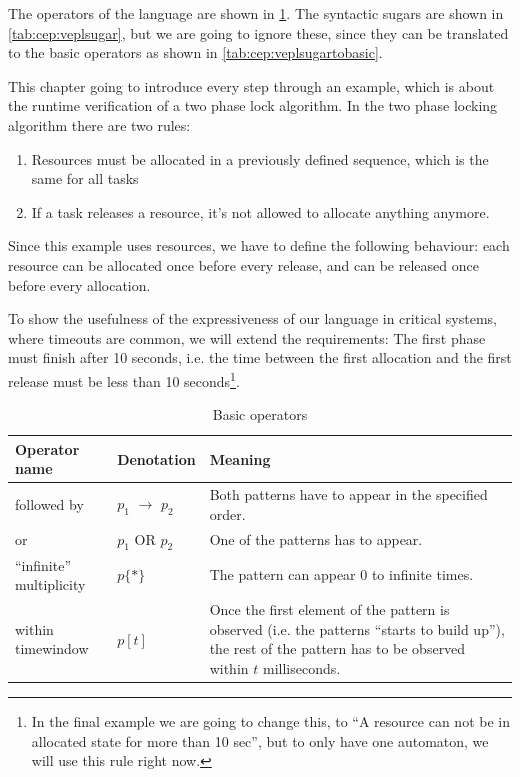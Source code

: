 		
		The operators of the language are shown in \cref{tab:cep:veplop}. 
		The syntactic sugars are shown in \cref{tab:cep:veplsugar},
		but we are going to ignore these, since they can be translated to the basic operators as shown in \cref{tab:cep:veplsugartobasic}.
		
		This chapter going to introduce every step through an example, which is about the runtime verification of a two phase lock algorithm. %
		In the two phase locking algorithm there are two rules:
		\begin{enumerate}
			\item Resources must be allocated in a previously defined sequence, which is the same for all tasks
			\item If a task releases a resource, it's not allowed to allocate anything anymore.
		\end{enumerate}
		
		Since this example uses resources, we have to define the following behaviour:
		each resource can be allocated once before every release, and can be released once before every allocation.
		
		To show the usefulness of the expressiveness of our language in critical systems, where timeouts are common, we will extend the requirements:
		The first phase must finish after 10 seconds,
		i.e. the time between the first allocation and the first release must be less than 10 seconds\footnote{In the final 
		example we are going to change this, to ``A resource can not be in allocated state for more than 10 sec'', but to 
		only have one automaton, we will use this rule right now.}.
		
			
		\begin{table}
		\caption{Basic operators}		
		\label{tab:cep:veplop}
			\begin{tabularx}{\textwidth}{llX}
				\toprule
				Operator name &	Denotation & Meaning \\
				\midrule
				followed by & $p_1$ $\rightarrow$ $p_2$ & Both patterns have to appear in the specified order. \\
				or & $p_1$ OR $p_2$ &	One of the patterns has to appear. \\
				``infinite'' multiplicity & $p\{\ast\}$ & The pattern can appear 0 to infinite times. \\
				within timewindow &	$p[t]$ & Once the first element of the pattern is observed (i.e. the patterns ``starts to build up''), the rest of the pattern has to be observed within $t$ milliseconds. \\
				\bottomrule
			\end{tabularx}
		\end{table}

